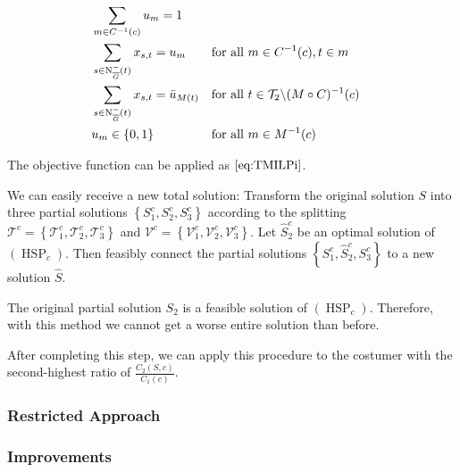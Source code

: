 \begin{align}
	& \sum_{m\in C^{-1}(c)} u_m = 1 \label{eq:HSP:costumer} \\
	& \sum_{s\in\operatorname{N}_{\overline{G}}^-(t)} x_{s,t} = u_m && \text{for all } m\in C^{-1}(c),t\in m \label{eq:HSP:route} \\
	& \sum_{s\in\operatorname{N}_{\overline{G}}^-(t)} x_{s,t} = \bar{u}_{M(t)} && \text{for all } t\in\mathcal{T}_2\backslash(M\circ C)^{-1}(c) \label{eq:HSP:route_fix} \\
	& u_m\in\{0,1\} && \text{for all } m\in M^{-1}(c) \label{eq:HSP:um}
\end{align}

The objective function can be applied as $\eqref{eq:TMILPi}$.

We can easily receive a new total solution: Transform the original solution $S$ into three partial solutions $\left\{S^c_1,S^c_2,S^c_3\right\}$ according to the splitting $\mathcal{T}^c=\left\{\mathcal{T}^c_1,\mathcal{T}^c_2,\mathcal{T}^c_3\right\}$ and $\mathcal{V}^c=\left\{\mathcal{V}^c_1,\mathcal{V}^c_2,\mathcal{V}^c_3\right\}$. Let $\hat{S}^c_2$ be an optimal solution of $(\operatorname{HSP}_c)$. Then feasibly connect the partial solutions $\left\{S^c_1,\hat{S}^c_2,S^c_3\right\}$ to a new solution $\hat{S}$. 

The original partial solution $S_2$ is a feasible solution of $(\operatorname{HSP}_c)$. Therefore, with this method we cannot get a worse entire solution than before.

After completing this step, we can apply this procedure to the costumer with the second-highest ratio of $\frac{C_2(S,c)}{C_1(c)}$.


\subsubsection{Restricted Approach}


\subsubsection{Improvements}